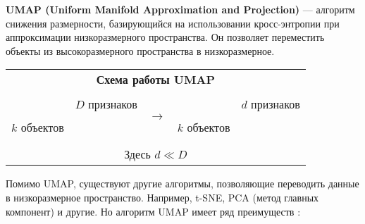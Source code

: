 \graphicspath{{main/}}
\textbf{UMAP (Uniform Manifold Approximation and Projection)} --- алгоритм снижения размерности, базирующийся на использовании кросс-энтропии при аппроксимации низкоразмерного пространства. Он позволяет переместить объекты из высокоразмерного пространства в низкоразмерное.
\begin{center}
\begin{tabular}{|c|p{0.5cm}|p{0.5cm}|p{0.5cm}|p{0.5cm}|p{0.5cm}|p{0.6cm}|c|p{0.5cm}|p{0.5cm}|p{0.5cm}|}
	\multicolumn{11}{c}{\textbf{Схема работы UMAP}}\\
	\multicolumn{11}{c}{ }\\
	\cline{1-6}
	\cline{8-11}
	& \multicolumn{5}{c|}{$D$ признаков} & \multirow{7}{2cm}{$\longrightarrow$} & & \multicolumn{3}{c|}{$d$ признаков}\\
	\cline{1-6}
	\cline{8-11}
	\multirow{6}{*}{$k$ объектов} & & & & & & & \multirow{6}{*}{$k$ объектов} & & &\\
	\cline{2-6}
	\cline{9-11}
	 & & & & & & & & & &\\
	\cline{2-6}
	\cline{9-11}
	 & & & & & & & & & &\\
	\cline{2-6}
	\cline{9-11}
	 & & & & & & & & & &\\
	\cline{2-6}
	\cline{9-11}
	 & & & & & & & & & &\\
	\cline{2-6}
	\cline{9-11}
	& & & & & & & & & &\\
	\cline{1-6}
	\cline{8-11}
	\multicolumn{11}{c}{ }\\
	\multicolumn{11}{c}{Здесь $d \ll D$}\\
\end{tabular}
\end{center}


Помимо UMAP, существуют другие алгоритмы, позволяющие переводить данные в низкоразмерное пространство. Например, t-SNE, PCA (метод главных компонент) и другие. Но алгоритм UMAP имеет ряд преимуществ \cite{mcinnes}:

